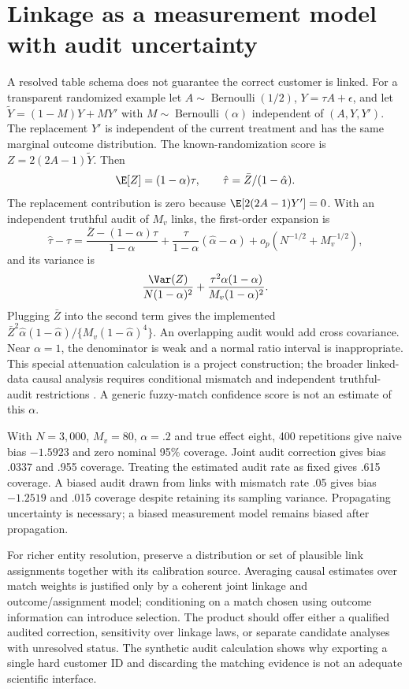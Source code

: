 \section{Linkage as a measurement model with audit uncertainty}
\label{s5:linkage}
A resolved table schema does not guarantee the correct customer is linked.
For a transparent randomized example let $A\sim\operatorname{Bernoulli}(1/2)$,
$Y=\tau A+\epsilon$, and let $\widetilde Y=(1-M)Y+MY'$ with
$M\sim\operatorname{Bernoulli}(\alpha)$ independent of $(A,Y,Y')$.
The replacement $Y'$ is independent of the current treatment and has the
same marginal outcome distribution. The known-randomization score is
$Z=2(2A-1)\widetilde Y$. Then
\[
 \E[Z]=(1-\alpha)\tau,\qquad
 \hat\tau=\bar Z/(1-\hat\alpha).
\]
The replacement contribution is zero because
$\E[2(2A-1)Y']=0$. With an independent truthful audit of $M_v$ links,
the first-order expansion is
\[
 \hat\tau-\tau=\frac{\bar Z-(1-\alpha)\tau}{1-\alpha}
 +\frac{\tau}{1-\alpha}(\hat\alpha-\alpha)+o_p(N^{-1/2}+M_v^{-1/2}),
\]
and its variance is
\begin{equation}
 \frac{\Var(Z)}{N(1-\alpha)^2}
 +\frac{\tau^2\alpha(1-\alpha)}{M_v(1-\alpha)^2}.
 \label{s5:link-variance}
\end{equation}
Plugging $\bar Z$ into the second term gives the implemented
$\bar Z^2\hat\alpha(1-\hat\alpha)/\{M_v(1-\hat\alpha)^4\}$.
An overlapping audit would add cross covariance. Near $\alpha=1$, the
denominator is weak and a normal ratio interval is inappropriate. This
special attenuation calculation is a project construction; the broader
linked-data causal analysis requires conditional mismatch and independent
truthful-audit restrictions \citep[Assumptions A1--A5]{slawski2025}.
A generic fuzzy-match confidence score is not an estimate of this $\alpha$.

With $N=3,000$, $M_v=80$, $\alpha=.2$ and true effect eight, 400 repetitions
give naive bias $-1.5923$ and zero nominal 95\% coverage. Joint audit
correction gives bias $.0337$ and .955 coverage. Treating the estimated audit
rate as fixed gives .615 coverage. A biased audit drawn from links with
mismatch rate .05 gives bias $-1.2519$ and .015 coverage despite retaining
its sampling variance. Propagating uncertainty is necessary; a biased
measurement model remains biased after propagation.

For richer entity resolution, preserve a distribution or set of plausible
link assignments together with its calibration source. Averaging causal
estimates over match weights is justified only by a coherent joint linkage
and outcome/assignment model; conditioning on a match chosen using outcome
information can introduce selection. The product should offer either a
qualified audited correction, sensitivity over linkage laws, or separate
candidate analyses with unresolved status. The synthetic audit calculation
shows why exporting a single hard customer ID and discarding the matching
evidence is not an adequate scientific interface.
